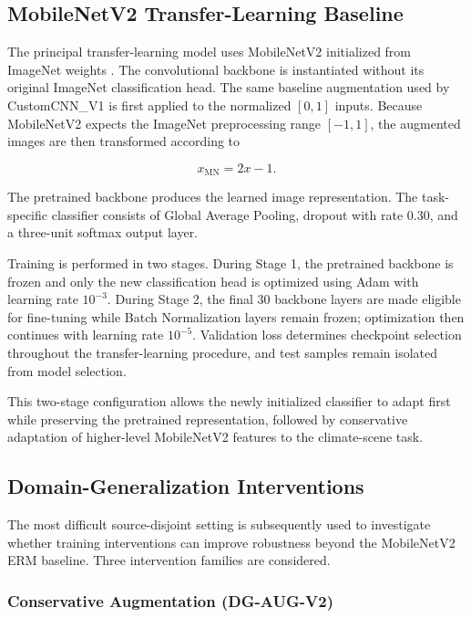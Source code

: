 \subsection{MobileNetV2 Transfer-Learning Baseline}

The principal transfer-learning model uses MobileNetV2 initialized from
ImageNet weights \cite{sandler2018mobilenetv2}. The convolutional
backbone is instantiated without its original ImageNet classification
head. The same baseline augmentation used by CustomCNN\_V1 is first
applied to the normalized \([0,1]\) inputs. Because MobileNetV2 expects
the ImageNet preprocessing range \([-1,1]\), the augmented images are
then transformed according to

\[
x_{\mathrm{MN}} = 2x - 1.
\]

The pretrained backbone produces the learned image representation. The
task-specific classifier consists of Global Average Pooling, dropout with
rate \(0.30\), and a three-unit softmax output layer.

Training is performed in two stages. During Stage 1, the pretrained
backbone is frozen and only the new classification head is optimized using
Adam with learning rate \(10^{-3}\). During Stage 2, the final 30 backbone
layers are made eligible for fine-tuning while Batch Normalization layers
remain frozen; optimization then continues with learning rate \(10^{-5}\).
Validation loss determines checkpoint selection throughout the
transfer-learning procedure, and test samples remain isolated from model
selection.

This two-stage configuration allows the newly initialized classifier to
adapt first while preserving the pretrained representation, followed by
conservative adaptation of higher-level MobileNetV2 features to the
climate-scene task.

\subsection{Domain-Generalization Interventions}

The most difficult source-disjoint setting is subsequently used to
investigate whether training interventions can improve robustness beyond
the MobileNetV2 ERM baseline. Three intervention families are considered.

\subsubsection{Conservative Augmentation (DG-AUG-V2)}

